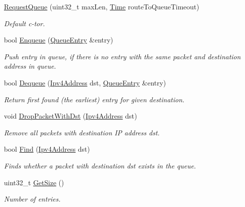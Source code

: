 \begin{DoxyCompactItemize}
\item 
\hyperlink{classns3_1_1aodv_1_1RequestQueue_ac4d5b008b8daeb70d0ababd5695401da}{Request\+Queue} (uint32\+\_\+t max\+Len, \hyperlink{classns3_1_1Time}{Time} route\+To\+Queue\+Timeout)
\begin{DoxyCompactList}\small\item\em Default c-\/tor. \end{DoxyCompactList}\item 
bool \hyperlink{classns3_1_1aodv_1_1RequestQueue_ac48ac1f8e19e35f239176e1f3ff038ec}{Enqueue} (\hyperlink{classns3_1_1aodv_1_1QueueEntry}{Queue\+Entry} \&entry)
\begin{DoxyCompactList}\small\item\em Push entry in queue, if there is no entry with the same packet and destination address in queue. \end{DoxyCompactList}\item 
bool \hyperlink{classns3_1_1aodv_1_1RequestQueue_a1711433b4999cfd7ee30dd88103a2555}{Dequeue} (\hyperlink{classns3_1_1Ipv4Address}{Ipv4\+Address} dst, \hyperlink{classns3_1_1aodv_1_1QueueEntry}{Queue\+Entry} \&entry)
\begin{DoxyCompactList}\small\item\em Return first found (the earliest) entry for given destination. \end{DoxyCompactList}\item 
void \hyperlink{classns3_1_1aodv_1_1RequestQueue_ac133e18007238865cda0bc74b6b59f50}{Drop\+Packet\+With\+Dst} (\hyperlink{classns3_1_1Ipv4Address}{Ipv4\+Address} dst)
\begin{DoxyCompactList}\small\item\em Remove all packets with destination IP address dst. \end{DoxyCompactList}\item 
bool \hyperlink{classns3_1_1aodv_1_1RequestQueue_a5ab010b36f59a67d05d55fde75a50461}{Find} (\hyperlink{classns3_1_1Ipv4Address}{Ipv4\+Address} dst)
\begin{DoxyCompactList}\small\item\em Finds whether a packet with destination dst exists in the queue. \end{DoxyCompactList}\item 
uint32\+\_\+t \hyperlink{classns3_1_1aodv_1_1RequestQueue_ac4775afbe477b1cfe41fa83c7bf113aa}{Get\+Size} ()
\begin{DoxyCompactList}\small\item\em Number of entries. \end{DoxyCompactList}\item 

\end{DoxyCompactItemize}
